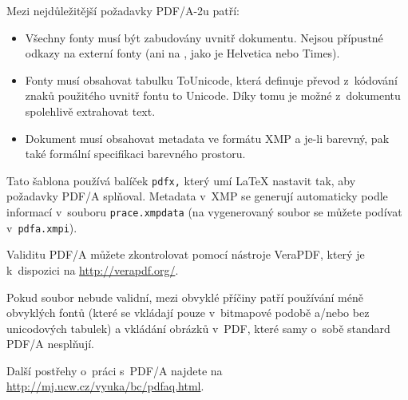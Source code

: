 Mezi nejdůležitější požadavky PDF/A-2u patří:

\begin{itemize}

\item Všechny fonty musí být zabudovány uvnitř dokumentu. Nejsou přípustné
odkazy na externí fonty (ani na , jako je Helvetica nebo Times).

\item Fonty musí obsahovat tabulku ToUnicode, která definuje převod z~kódování
znaků použitého uvnitř fontu to Unicode. Díky tomu je možné z~dokumentu
spolehlivě extrahovat text.

\item Dokument musí obsahovat metadata ve formátu XMP a je-li barevný,
pak také formální specifikaci barevného prostoru.

\end{itemize}

Tato šablona používá balíček {\tt pdfx,} který umí \LaTeX{} nastavit tak,
aby požadavky PDF/A splňoval. Metadata v~XMP se generují automaticky podle
informací v~souboru {\tt prace.xmpdata} (na vygenerovaný soubor se můžete
podívat v~{\tt pdfa.xmpi}).

Validitu PDF/A můžete zkontrolovat pomocí nástroje VeraPDF, který je
k~dispozici na \url{http://verapdf.org/}.

Pokud soubor nebude validní, mezi obvyklé příčiny patří používání méně
obvyklých fontů (které se vkládají pouze v~bitmapové podobě a/nebo bez
unicodových tabulek) a vkládání obrázků v~PDF, které samy o~sobě standard
PDF/A nesplňují.

Další postřehy o~práci s~PDF/A najdete na \url{http://mj.ucw.cz/vyuka/bc/pdfaq.html}.
